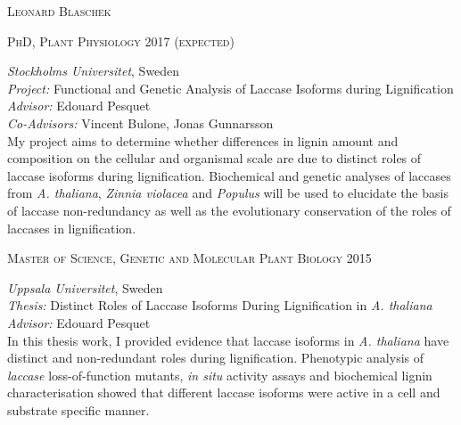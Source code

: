 \documentclass[11pt]{article}
\begin{document}
	\setlength\parindent{15pt}
\begin{center}
	\huge{\textsc{Leonard Blaschek}}
	\vspace*{1cm}
\end{center}

\vspace{0.2cm}

\textsc{\large{PhD, Plant Physiology}} \hfill \textsc{2017 \textnormal{(expected)}}
\begin{addmargin}[24pt]{0pt}
	\textit{Stockholms Universitet}, Sweden \\
	\textit{Project:} Functional and Genetic Analysis of Laccase Isoforms during Lignification \\
	\textit{Advisor:} Edouard Pesquet \\
	\textit{Co-Advisors:} Vincent Bulone, Jonas Gunnarsson
	\vspace{0.1cm} \\
	\small{My project aims to determine whether differences in lignin amount and composition on the cellular and organismal scale are due to distinct roles of laccase isoforms during lignification. Biochemical and genetic analyses of laccases from \textit{A. thaliana}, \textit{Zinnia violacea} and \textit{Populus} will be used to elucidate the basis of laccase non-redundancy as well as the evolutionary conservation of the roles of laccases in lignification.}
\end{addmargin}
\vspace{0.5cm}

\textsc{\large{Master of Science, Genetic and Molecular Plant Biology}} \hfill \textsc{2015}
\begin{addmargin}[24pt]{0pt}
	\textit{Uppsala Universitet}, Sweden \\
	\textit{Thesis:} Distinct Roles of Laccase Isoforms During Lignification in \textit{ A. thaliana}\\
	\textit{Advisor:} Edouard Pesquet
	\vspace{0.1cm} \\
	\small{In this thesis work, I provided evidence that laccase isoforms in \textit{A. thaliana} have distinct and non-redundant roles during lignification. Phenotypic analysis of \textit{laccase} loss-of-function mutants, \textit{in situ} activity assays and biochemical lignin characterisation showed that different laccase isoforms were active in a cell and substrate specific manner.}
\end{addmargin}
\vspace{0.5cm}
\end{document}
